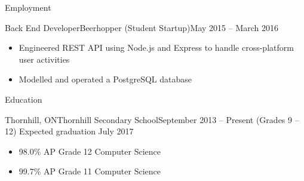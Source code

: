 \documentclass[]{mcdowellcv}
\begin{document}
	\makeheader

	\begin{cvsection}{Employment}
		\begin{cvsubsection}{Back End Developer}{Beerhopper (Student Startup)}{May 2015 -- March 2016}
			\begin{itemize}
				\item Engineered REST API using Node.js and Express to handle cross-platform user activities
				\item Modelled and operated a PostgreSQL database
			\end{itemize}
		\end{cvsubsection}
	\end{cvsection}

	\begin{cvsection}{Education}
		\begin{cvsubsection}{Thornhill, ON}{Thornhill Secondary School}{September 2013 -- Present (Grades 9 -- 12)}
            Expected graduation July 2017
			\begin{itemize}
				\item 98.0\% AP Grade 12 Computer Science
				\item 99.7\% AP Grade 11 Computer Science
			\end{itemize}
		\end{cvsubsection}
	\end{cvsection}
\end{document}

